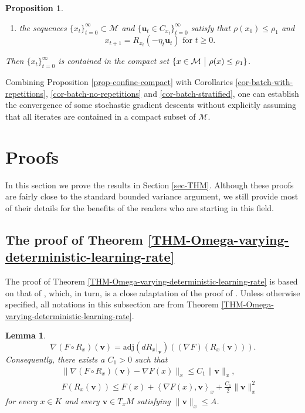 \documentclass{amsart}
\newcommand{\M}{\mathcal{M}}
\theoremstyle{plain}
\newtheorem{lemma}[theorem]{Lemma}
\newtheorem{proposition}[theorem]{Proposition}
\theoremstyle{definition}
\theoremstyle{remark}
\numberwithin{theorem}{section}
\numberwithin{equation}{section}
\begin{document}
\begin{proposition}
\begin{enumerate}[1.]
\begin{enumerate}
		\item the sequences $\{x_t\}_{t=0}^\infty\subset \M$ and $\{\mathbf{u}_t \in C_{x_t}\}_{t=0}^\infty$ satisfy that $\rho(x_0) \leq \rho_1$ and
		\begin{equation}\label{eq-def-x-t-adaptive}
x_{t+1} = R_{x_t}\left(-\eta_t\mathbf{u}_t\right) \text{ for } t\geq 0.
\end{equation}
	\end{enumerate}
	Then $\{x_t\}_{t=0}^\infty$ is contained in the compact set $\{x\in \M ~\big{|}~ \rho(x)\leq \rho_1\}$.
\end{enumerate}
\end{proposition}

Combining Proposition \ref{prop-confine-compact} with Corollaries \ref{cor-batch-with-repetitions}, \ref{cor-batch-no-repetitions} and \ref{cor-batch-stratified}, one can establish the convergence of some stochastic gradient descents without explicitly assuming that all iterates are contained in a compact subset of $\M$. 

\section{Proofs}\label{app-proofs}

In this section we prove the results in Section \ref{sec-THM}. Although these proofs are fairly close to the standard bounded variance argument, we still provide most of their details for the benefits of the readers who are starting in this field. 

\subsection{The proof of Theorem \ref{THM-Omega-varying-deterministic-learning-rate}}  

The proof of Theorem \ref{THM-Omega-varying-deterministic-learning-rate} is based on that of \cite[Theorem 2.6]{XYW-2024}, which, in turn, is a close adaptation of the proof of \cite[Proposition 4]{Bertsekas-Tsitsiklis-gradient}. Unless otherwise specified, all notations in this subsection are from Theorem \ref{THM-Omega-varying-deterministic-learning-rate}.

\begin{lemma}\label{lemma-F-K-A-Lipschitz}
\begin{equation}\label{eq-nabla-F-R-adj}
\nabla (F\circ R_x)(\mathbf{v})=\mathrm{adj}(dR_x|_{\mathbf{v}})((\nabla F)(R_x(\mathbf{v}))).
\end{equation}  
Consequently, there exists a $C_1>0$ such that 
\begin{eqnarray}
\label{eq-F-K-A-Lipschitz-1} && \|\nabla (F\circ R_x)(\mathbf{v}) - \nabla F(x)\|_x \leq C_1\|\mathbf{v}\|_x, \\ 
\label{eq-F-K-A-Lipschitz-2} && F(R_x(\mathbf{v})) \leq F(x) + \left\langle \nabla F(x), \mathbf{v} \right\rangle_x + \frac{C_1}{2}\|\mathbf{v}\|_x^2
\end{eqnarray}
for every $x\in K$ and every $\mathbf{v}\in T_x M$ satisfying $\|\mathbf{v}\|_x\leq A$.
\end{lemma}
\end{document}
